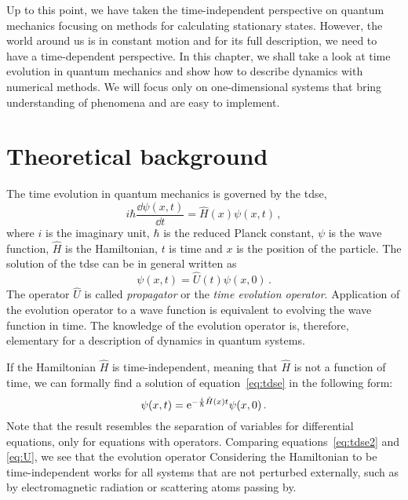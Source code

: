 Up to this point, we have taken the time-independent perspective on quantum mechanics focusing on methods for calculating stationary states. However, the world around us is in constant motion and for its full description, we need to have a time-dependent perspective. In this chapter, we shall take a look at time evolution in quantum mechanics and show how to describe dynamics with numerical methods. We will focus only on one-dimensional systems that bring understanding of phenomena and are easy to implement.

\section{Theoretical background}

The time evolution in quantum mechanics is governed by the \acrfull{tdse},
\begin{equation}
    i\hbar\frac{\dd\psi(x,t)}{\dd t} = \hat{H}(x)\psi(x,t) \, ,
    \label{eq:tdse}
\end{equation}
where $i$ is the imaginary unit, $\hbar$ is the reduced Planck constant, $\psi$ is the wave function, $\hat{H}$ is the Hamiltonian, $t$ is time and $x$ is the position of the particle. The solution of the \acrshort{tdse} can be in general written as
\begin{equation}
    \psi(x,t) = \hat{U}(t)\psi(x,0) \, .
    \label{eq:U}
\end{equation}
The operator $\hat{U}$ is called \textit{propagator} or the \textit{time evolution operator}. Application of the evolution operator to a wave function is equivalent to evolving the wave function in time. The knowledge of the evolution operator is, therefore, elementary for a description of dynamics in quantum systems.

If the Hamiltonian $\hat{H}$ is time-independent, meaning that $\hat{H}$ is not a function of time, we can formally find a solution of equation~\eqref{eq:tdse} in the following form:
\begin{equation}
    \psi(x,t) = \mathrm{e}^{-\frac{i}{\hbar}\hat{H}(x)t} \psi(x,0)\, .
    \label{eq:tdse2}
\end{equation}
Note that the result resembles the separation of variables for differential equations, only for equations with operators. Comparing equations~\eqref{eq:tdse2} and \eqref{eq:U}, we see that the evolution operator 
Considering the Hamiltonian to be time-independent works for all systems that are not perturbed externally, such as by electromagnetic radiation or scattering atoms passing by. 

